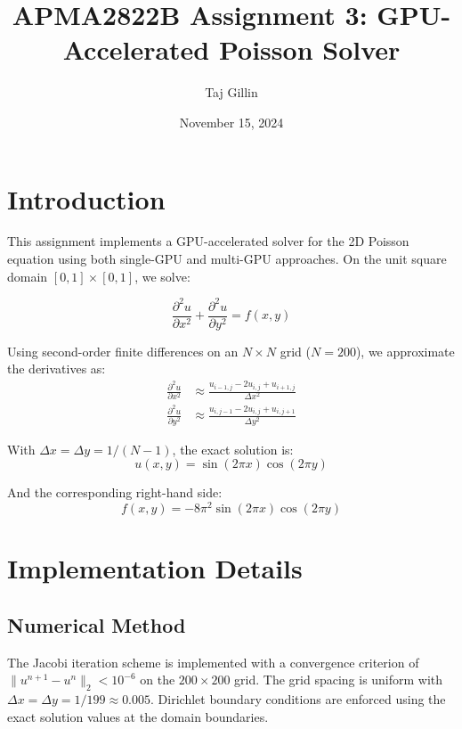 \documentclass{article}
\title{APMA2822B Assignment 3: GPU-Accelerated Poisson Solver}
\author{Taj Gillin}
\date{November 15, 2024}
\begin{document}
\maketitle
 
\section{Introduction}

This assignment implements a GPU-accelerated solver for the 2D Poisson equation using both single-GPU and multi-GPU approaches. On the unit square domain $[0,1] \times [0,1]$, we solve:

\begin{equation}
    \frac{\partial^2 u}{\partial x^2} + \frac{\partial^2 u}{\partial y^2} = f(x,y)
\end{equation}

Using second-order finite differences on an $N \times N$ grid ($N=200$), we approximate the derivatives as:
\begin{align}
    \frac{\partial^2 u}{\partial x^2} &\approx \frac{u_{i-1,j} - 2u_{i,j} + u_{i+1,j}}{\Delta x^2} \\
    \frac{\partial^2 u}{\partial y^2} &\approx \frac{u_{i,j-1} - 2u_{i,j} + u_{i,j+1}}{\Delta y^2}
\end{align}

With $\Delta x = \Delta y = 1/(N-1)$, the exact solution is:
\begin{equation}
    u(x,y) = \sin(2\pi x)\cos(2\pi y)
\end{equation}

And the corresponding right-hand side:
\begin{equation}
    f(x,y) = -8\pi^2\sin(2\pi x)\cos(2\pi y)
\end{equation}

\section{Implementation Details}

\subsection{Numerical Method}
The Jacobi iteration scheme is implemented with a convergence criterion of $\|u^{n+1} - u^n\|_2 < 10^{-6}$ on the $200 \times 200$ grid. The grid spacing is uniform with $\Delta x = \Delta y = 1/199 \approx 0.005$. Dirichlet boundary conditions are enforced using the exact solution values at the domain boundaries.
\end{document}
